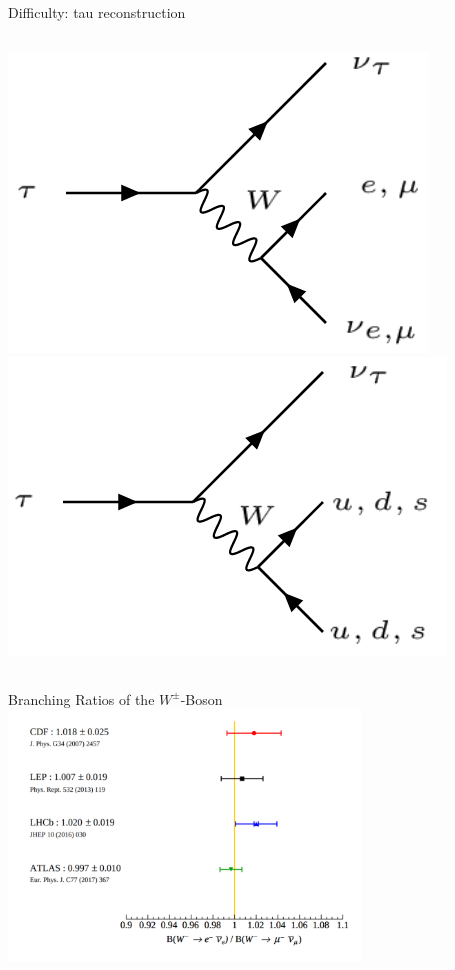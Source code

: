 \begin{frame}{Difficulty: tau reconstruction}
\begin{columns}
            \begin{column}{0.55\textwidth}
                \includegraphics[scale=0.3]{content/feynman/png/tau_lep.png}
                \includegraphics[scale=0.3]{content/feynman/png/tau_had.png}
            \end{column}
        \end{columns}
    \end{frame}

    \begin{frame}{Branching Ratios of the $W^{\pm}$-Boson}
        \includegraphics[width=0.7\textwidth]{content/images/BR_W.png}
    \end{frame}

